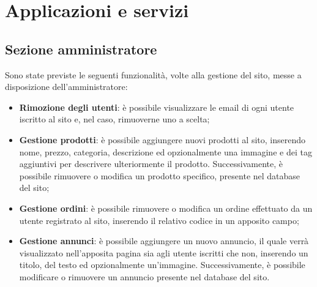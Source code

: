 \section{Applicazioni e servizi} %
	\subsection{Sezione amministratore}
	Sono state previste le seguenti funzionalità, volte alla gestione del sito, messe a disposizione dell'amministratore:
	\begin{itemize}
		\item \textbf{Rimozione degli utenti}: è possibile visualizzare le email di ogni utente iscritto al sito e, nel caso, rimuoverne uno a scelta;
		\item \textbf{Gestione prodotti}: è possibile aggiungere nuovi prodotti al sito, inserendo nome, prezzo, categoria, descrizione ed opzionalmente una immagine e dei tag aggiuntivi per descrivere ulteriormente il prodotto. Successivamente, è possibile rimuovere o modifica un prodotto specifico, presente nel database del sito;
		\item \textbf{Gestione ordini}: è possibile rimuovere o modifica un ordine effettuato da un utente registrato al sito, inserendo il relativo codice in un apposito campo;
		\item \textbf{Gestione annunci}: è possibile aggiungere un nuovo annuncio, il quale verrà visualizzato nell'apposita pagina sia agli utente iscritti che non, inserendo un titolo, del testo ed opzionalmente un'immagine. Successivamente, è possibile modificare o rimuovere un annuncio presente nel database del sito.
	\end{itemize}
	
